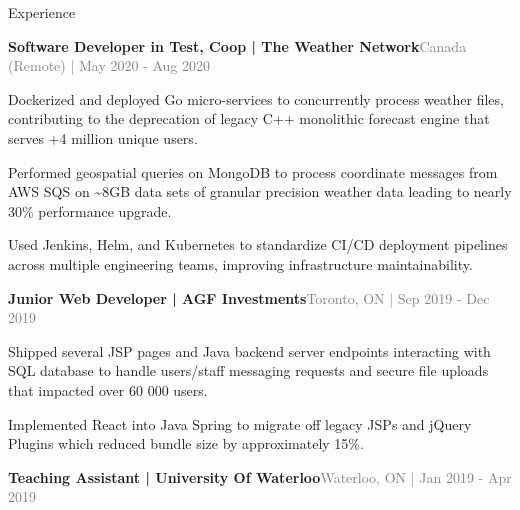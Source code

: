 \documentclass[hidelinks]{resume} %
\begin{document}
\begin{rSection}{Experience}
\begin{rSubsection}{\textbf{Software Developer in Test, Coop | The Weather Network}}{\textcolor{gray}{\small Canada (Remote) | May 2020 - Aug 2020}}{}
        \begin{bulletpoints}
            \vspace{-.10cm}
            \item Dockerized and deployed Go micro-services to concurrently process weather files, contributing to the deprecation of legacy C++ monolithic forecast engine that serves +4 million unique users.
             \vspace{-.13cm}
            \item Performed geospatial queries on MongoDB to process coordinate messages from AWS SQS on \textasciitilde 8GB data sets of granular precision weather data leading to nearly 30\% performance upgrade.
            \vspace{-.13cm}
             \item Used Jenkins, Helm, and Kubernetes to standardize CI/CD deployment pipelines across multiple engineering teams, improving infrastructure maintainability.
             \vspace{-.10cm}
        \end{bulletpoints}
\end{rSubsection}
\begin{rSubsection}{\textbf{Junior Web Developer | AGF Investments}}{\textcolor{gray}{\small Toronto, ON | Sep 2019 - Dec 2019}}{}
        \par
        \begin{bulletpoints}
            \vspace{-.10cm}
            \item Shipped several JSP pages and Java backend server endpoints interacting with SQL database to handle users/staff messaging requests and secure file uploads that impacted over 60 000 users.
            \vspace{-.13cm}
            \item Implemented React into Java Spring to migrate off legacy JSPs and jQuery Plugins which reduced bundle size by approximately 15\%.
             \vspace{-.10cm}
        \end{bulletpoints}
\end{rSubsection}
\begin{rSubsection}{\textbf{Teaching Assistant | University Of Waterloo}}{\textcolor{gray}{\small Waterloo, ON | Jan 2019 - Apr 2019}}{}


\end{rSubsection}
\end{rSection}
\end{document}

